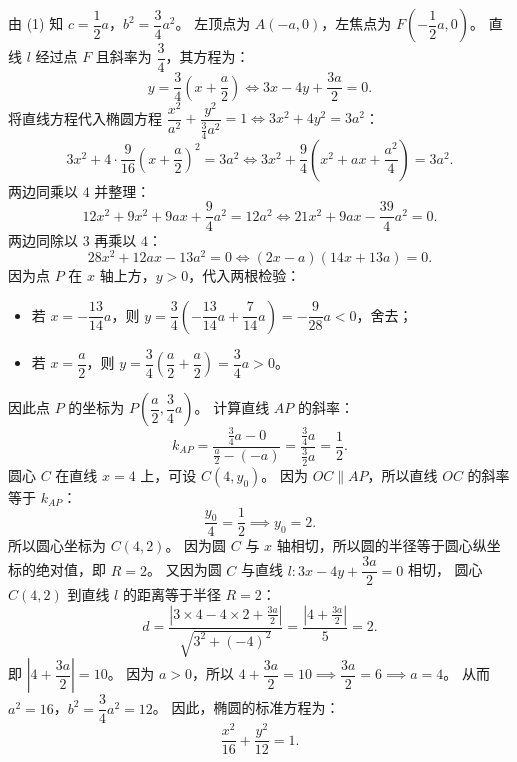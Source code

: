 \begin{answer}
由 (1) 知 $c = \dfrac{1}{2}a$，$b^2 = \dfrac{3}{4}a^2$。
左顶点为 $A(-a, 0)$，左焦点为 $F\left(-\dfrac{1}{2}a, 0\right)$。
直线 $l$ 经过点 $F$ 且斜率为 $\dfrac{3}{4}$，其方程为：
\nopagebreak[4]
\[y = \frac{3}{4}\left(x + \frac{a}{2}\right) \iff 3x - 4y + \frac{3a}{2} = 0.\]
将直线方程代入椭圆方程 $\dfrac{x^2}{a^2} + \dfrac{y^2}{\frac{3}{4}a^2} = 1 \iff 3x^2 + 4y^2 = 3a^2$：
\nopagebreak[4]
\[3x^2 + 4 \cdot \frac{9}{16}\left(x + \frac{a}{2}\right)^2 = 3a^2 \iff 3x^2 + \frac{9}{4}\left(x^2 + ax + \frac{a^2}{4}\right) = 3a^2.\]
两边同乘以 $4$ 并整理：
\nopagebreak[4]
\[12x^2 + 9x^2 + 9ax + \frac{9}{4}a^2 = 12a^2 \iff 21x^2 + 9ax - \frac{39}{4}a^2 = 0.\]
两边同除以 $3$ 再乘以 $4$：
\nopagebreak[4]
\[28x^2 + 12ax - 13a^2 = 0 \iff (2x - a)(14x + 13a) = 0.\]
因为点 $P$ 在 $x$ 轴上方，$y > 0$，代入两根检验：
\begin{itemize}
\item 若 $x = -\dfrac{13}{14}a$，则 $y = \dfrac{3}{4}\left(-\dfrac{13}{14}a + \dfrac{7}{14}a\right) = -\dfrac{9}{28}a < 0$，舍去；
\item 若 $x = \dfrac{a}{2}$，则 $y = \dfrac{3}{4}\left(\dfrac{a}{2} + \dfrac{a}{2}\right) = \dfrac{3}{4}a > 0$。
\end{itemize}
因此点 $P$ 的坐标为 $P\left(\dfrac{a}{2}, \dfrac{3}{4}a\right)$。
计算直线 $AP$ 的斜率：
\nopagebreak[4]
\[k_{AP} = \frac{\frac{3}{4}a - 0}{\frac{a}{2} - (-a)} = \frac{\frac{3}{4}a}{\frac{3}{2}a} = \frac{1}{2}.\]
圆心 $C$ 在直线 $x = 4$ 上，可设 $C(4, y_0)$。
因为 $OC \parallel AP$，所以直线 $OC$ 的斜率等于 $k_{AP}$：
\nopagebreak[4]
\[\frac{y_0}{4} = \frac{1}{2} \implies y_0 = 2.\]
所以圆心坐标为 $C(4, 2)$。
因为圆 $C$ 与 $x$ 轴相切，所以圆的半径等于圆心纵坐标的绝对值，即 $R = 2$。
又因为圆 $C$ 与直线 $l: 3x - 4y + \dfrac{3a}{2} = 0$ 相切，
圆心 $C(4, 2)$ 到直线 $l$ 的距离等于半径 $R = 2$：
\nopagebreak[4]
\[d = \frac{\left|3 \times 4 - 4 \times 2 + \frac{3a}{2}\right|}{\sqrt{3^2 + (-4)^2}} = \frac{\left|4 + \frac{3a}{2}\right|}{5} = 2.\]
即 $\left|4 + \dfrac{3a}{2}\right| = 10$。
因为 $a > 0$，所以 $4 + \dfrac{3a}{2} = 10 \implies \dfrac{3a}{2} = 6 \implies a = 4$。
从而 $a^2 = 16$，$b^2 = \dfrac{3}{4}a^2 = 12$。
因此，椭圆的标准方程为：
\nopagebreak[4]
\[\frac{x^2}{16} + \frac{y^2}{12} = 1.\]



\end{answer}
